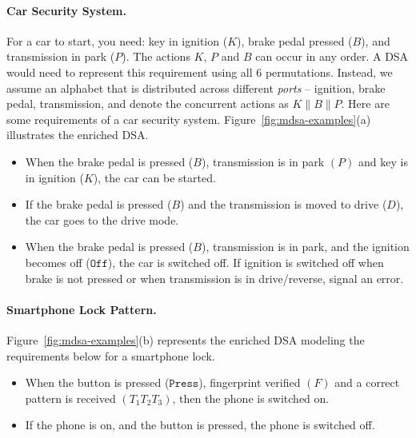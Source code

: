    \paragraph*{Car Security System.} For a car to start, you need: key in ignition ($K$), brake pedal pressed ($B$), and transmission in park ($P$). The actions $K$, $P$ and $B$ can occur in any order. A DSA would need to represent this requirement using all $6$ permutations. Instead, we assume an alphabet that is distributed across different \emph{ports} -- ignition, brake pedal, transmission, and denote the concurrent actions as $K \parallel B \parallel P$. Here are some requirements of a car security system. Figure~\ref{fig:mdsa-examples}(a) illustrates the enriched DSA.

   \begin{itemize}
   \item When the brake pedal is pressed ($B$), transmission is in park $(P)$ and key is in ignition ($K$), the car can be started.
   \item If the brake pedal is pressed ($B$) and the transmission is moved to drive ($D$), the car goes to the drive mode.
   \item When the brake pedal is pressed ($B$), transmission is in park, and the ignition becomes off ($\mathtt{Off}$), the car is switched off. If ignition is switched off when brake is not pressed or when transmission is in drive/reverse, signal an error.
   \end{itemize}

  
   \paragraph*{Smartphone Lock Pattern.} %
   Figure~\ref{fig:mdsa-examples}(b) represents the enriched DSA modeling the requirements below for a smartphone lock.

   \begin{itemize}
   \item When the button is pressed ($\mathtt{Press}$), fingerprint verified $(F)$ and a correct pattern is received $(T_1 T_2 T_3)$, then the phone is switched on.
   \item If the phone is on, and the button is pressed, the phone is switched off.  
   \end{itemize}
   
